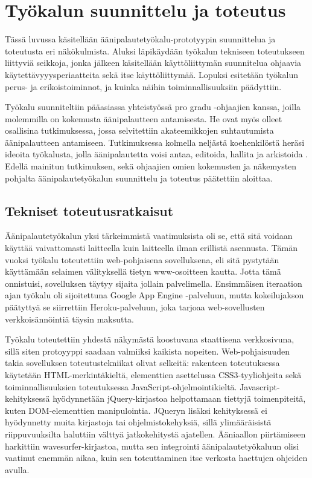 \documentclass[utf8]{gradu3}
\begin{document}
\chapter{Työkalun suunnittelu ja toteutus}

Tässä luvussa käsitellään äänipalautetyökalu-prototyypin suunnittelua ja toteutusta eri näkökulmista. Aluksi läpikäydään työkalun tekniseen toteutukseen liittyviä seikkoja, jonka jälkeen käsitellään käyttöliittymän suunnitelua ohjaavia käytettävyyysperiaatteita sekä itse käyttöliittymää. Lopuksi esitetään työkalun perus- ja erikoistoiminnot, ja kuinka näihin toiminnallisuuksiin päädyttiin.

Työkalu suunniteltiin pääasiassa yhteistyössä pro gradu -ohjaajien kanssa, joilla molemmilla on kokemusta äänipalautteen antamisesta. He ovat myös olleet osallisina tutkimuksessa, jossa selvitettiin akateemikkojen suhtautumista äänipalautteen antamiseen. Tutkimuksessa kolmella neljästä koehenkilöstä heräsi ideoita työkalusta, jolla äänipalautetta voisi antaa, editoida, hallita ja arkistoida \parencite[][]{academics}. Edellä mainitun tutkimuksen, sekä ohjaajien omien kokemusten ja näkemysten pohjalta äänipalautetyökalun suunnittelu ja toteutus päätettiin aloittaa.

\section{Tekniset toteutusratkaisut}

Äänipalautetyökalun yksi tärkeimmistä vaatimuksista oli se, että sitä voidaan käyttää vaivattomasti laitteella kuin laitteella ilman erillistä asennusta. Tämän vuoksi työkalu toteutettiin web-pohjaisena sovelluksena, eli sitä pystytään käyttämään selaimen välityksellä tietyn www-osoitteen kautta. Jotta tämä onnistuisi, sovelluksen täytyy sijaita jollain palvelimella. Ensimmäisen iteraation ajan työkalu oli sijoitettuna Google App Engine -palveluun, mutta kokeilujakson päätyttyä se siirrettiin Heroku-palveluun, joka tarjoaa web-sovellusten verkkoisännöintiä täysin maksutta. 

Työkalu toteutettiin yhdestä näkymästä koostuvana staattisena verkkosivuna, sillä siten protoyyppi saadaan valmiiksi kaikista nopeiten. Web-pohjaisuuden takia sovelluksen toteutustekniikat olivat selkeitä: rakenteen toteutuksessa käytetään HTML-merkintäkieltä, elementtien asettelussa CSS3-tyyliohjeita sekä toiminnallisuuksien toteutuksessa JavaScript-ohjelmointikieltä. Javascript-kehityksessä hyödynnetään jQuery-kirjastoa helpottamaan tiettyjä toimenpiteitä, kuten DOM-elementtien manipulointia. JQueryn lisäksi kehityksessä ei hyödynnetty muita kirjastoja tai ohjelmistokehyksiä, sillä ylimääräisistä riippuvuuksilta haluttiin välttyä jatkokehitystä ajatellen. Ääniaallon piirtämiseen harkittiin wavesurfer-kirjastoa, mutta sen integrointi äänipalautetyökaluun olisi vaatinut enemmän aikaa, kuin sen toteuttaminen itse verkosta haettujen ohjeiden avulla.
\end{document}
